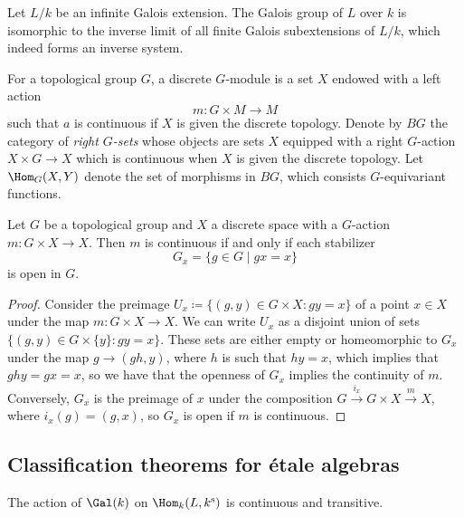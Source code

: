 \begin{remark}
	Let $L/k$ be an infinite Galois extension. The Galois group of $L$ over $k$ is isomorphic to the inverse limit of all finite Galois subextensions of $L/k$, which indeed forms an inverse system.
\end{remark}

\begin{definition}
	For a topological group $G$, a discrete $G$-module is a set $X$ endowed with a left action
	\[
		m: G \times M \to M
	\]
	such that $a$ is continuous if $X$ is given the discrete topology. Denote by $BG$ the category of \textit{right $G$-sets} whose objects are sets $X$ equipped with a right $G$-action $X \times G \to X$ which is continuous when $X$ is given the discrete topology. Let $\Hom_G(X,Y)$ denote the set of morphisms in $BG$, which consists $G$-equivariant functions.
\end{definition}


\begin{lemma}\label{lemma:stabilizer}
	Let $G$ be a topological group and $X$ a discrete space with a $G$-action $m \colon G \times X \to X$. Then $m$ is continuous if and only if each stabilizer
	\[
		G_x = \{ g \in G \mid gx = x \}
	\]
	is open in $G$.
\end{lemma}

\begin{proof}
	Consider the preimage $U_x \coloneqq \{ (g,y) \in G \times X \colon gy = x\}$ of a point $x \in X$ under the map $m: G \times X \to X$. We can write $U_x$ as a disjoint union of sets $\{(g,y) \in G \times \{y\} \colon gy = x\}$. These sets are either empty or homeomorphic to $G_x$ under the map $g \to (gh, y)$, where $h$ is such that $hy = x$, which implies that $ghy = gx = x$, so we have that the openness of $G_x$ implies the continuity of $m$. Conversely, $G_x$ is the preimage of $x$ under the composition $G \xrightarrow{i_x} G \times X \xrightarrow{m} X$, where $i_x(g) = (g,x)$, so $G_x$ is open if $m$ is continuous.
\end{proof}

\subsection{Classification theorems for \'etale algebras}

\begin{theorem}
	The action of $\Gal(k)$ on $\Hom_k(L, k^\sep)$ is continuous and transitive.
\end{theorem}

